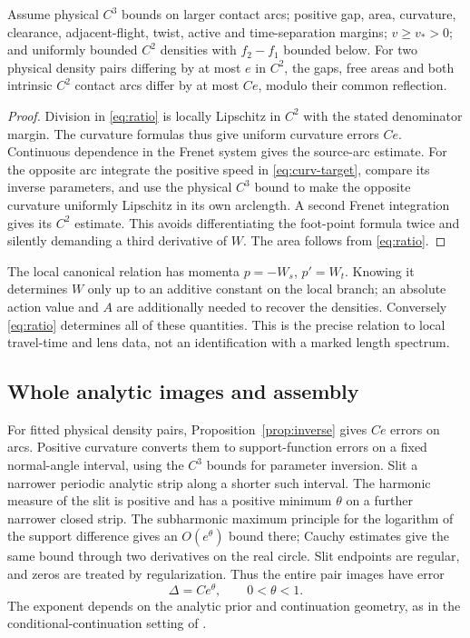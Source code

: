 \begin{proposition}
\label{prop:inverse}
Assume physical $C^3$ bounds on larger contact arcs; positive gap, area,
curvature, clearance, adjacent-flight, twist, active and time-separation
margins; $v\ge v_*>0$; and uniformly bounded $C^2$ densities with
$f_2-f_1$ bounded below. For two physical density pairs differing by
at most $e$ in $C^2$, the gaps, free areas and both intrinsic $C^2$
contact arcs differ by at most $Ce$, modulo their common reflection.
\end{proposition}
\begin{proof}
Division in \eqref{eq:ratio} is locally Lipschitz in $C^2$ with the
stated denominator margin. The curvature formulas thus give uniform
curvature errors $Ce$. Continuous dependence in the Frenet system gives
the source-arc estimate. For the opposite arc integrate the positive
speed in \eqref{eq:curv-target}, compare its inverse parameters, and
use the physical $C^3$ bound to make the opposite curvature uniformly
Lipschitz in its own arclength. A second Frenet integration gives its
$C^2$ estimate. This avoids differentiating the foot-point formula twice
and silently demanding a third derivative of $W$. The area follows
from \eqref{eq:ratio}.
\end{proof}

The local canonical relation has momenta $p=-W_s$, $p'=W_t$.
Knowing it determines $W$ only up to an additive constant on the local
branch; an absolute action value and $A$ are additionally needed to
recover the densities. Conversely \eqref{eq:ratio} determines all of
these quantities. This is the precise relation to local travel-time and
lens data, not an identification with a marked length spectrum.

\subsection{Whole analytic images and assembly}
For fitted physical density pairs, Proposition~\ref{prop:inverse} gives
$Ce$ errors on arcs. Positive curvature converts them to support-function
errors on a fixed normal-angle interval, using the $C^3$ bounds for
parameter inversion. Slit a narrower periodic analytic strip along a
shorter such interval. The harmonic measure of the slit is positive and
has a positive minimum $\theta$ on a further narrower closed strip.
The subharmonic maximum principle for the logarithm of the support
 difference gives an $O(e^\theta)$ bound there; Cauchy estimates give
the same bound through two derivatives on the real circle. Slit endpoints
are regular, and zeros are treated by regularization. Thus the entire
pair images have error
\begin{equation}\label{eq:Delta}
                         \Delta=Ce^\theta,\qquad 0<\theta<1.
\end{equation}
The exponent depends on the analytic prior and continuation geometry,
as in the conditional-continuation setting of \cite{Trefethen}.

